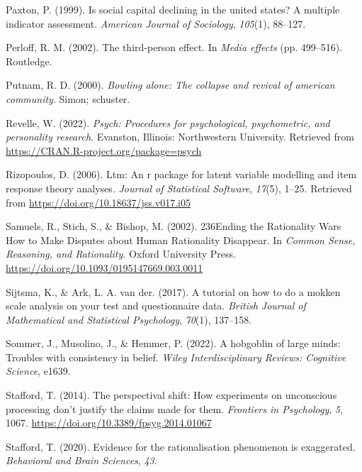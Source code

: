 \documentclass[
  ,jou,floatsintext]{apa6}
\newlength{\cslhangindent}
\newlength{\cslentryspacingunit} %
\newenvironment{CSLReferences}[2] %
 {%
  \setlength{\parindent}{0pt}
  \ifodd #1
  \let\oldpar\par
  \def\par{\hangindent=\cslhangindent\oldpar}
  \fi
  \setlength{\parskip}{#2\cslentryspacingunit}
 }%
 {}
\begin{document}
\begin{CSLReferences}{1}{0}
\leavevmode{}%
Paxton, P. (1999). Is social capital declining in the united states? A multiple indicator assessment. \emph{American Journal of Sociology}, \emph{105}(1), 88--127.

\leavevmode{}%
Perloff, R. M. (2002). The third-person effect. In \emph{Media effects} (pp. 499--516). Routledge.

\leavevmode{}%
Putnam, R. D. (2000). \emph{Bowling alone: The collapse and revival of american community}. Simon; schuster.

\leavevmode{}%
Revelle, W. (2022). \emph{Psych: Procedures for psychological, psychometric, and personality research}. Evanston, Illinois: Northwestern University. Retrieved from \url{https://CRAN.R-project.org/package=psych}

\leavevmode{}%
Rizopoulos, D. (2006). Ltm: An r package for latent variable modelling and item response theory analyses. \emph{Journal of Statistical Software}, \emph{17}(5), 1--25. Retrieved from \url{https://doi.org/10.18637/jss.v017.i05}

\leavevmode{}%
Samuels, R., Stich, S., \& Bishop, M. (2002). {236Ending the Rationality Wars How to Make Disputes about Human Rationality Disappear}. In \emph{{Common Sense, Reasoning, and Rationality}}. Oxford University Press. \url{https://doi.org/10.1093/0195147669.003.0011}

\leavevmode{}%
Sijtsma, K., \& Ark, L. A. van der. (2017). A tutorial on how to do a mokken scale analysis on your test and questionnaire data. \emph{British Journal of Mathematical and Statistical Psychology}, \emph{70}(1), 137--158.

\leavevmode{}%
Sommer, J., Musolino, J., \& Hemmer, P. (2022). A hobgoblin of large minds: Troubles with consistency in belief. \emph{Wiley Interdisciplinary Reviews: Cognitive Science}, e1639.

\leavevmode{}%
Stafford, T. (2014). The perspectival shift: How experiments on unconscious processing don't justify the claims made for them. \emph{Frontiers in Psychology}, \emph{5}, 1067. \url{https://doi.org/10.3389/fpsyg.2014.01067}

\leavevmode{}%
Stafford, T. (2020). Evidence for the rationalisation phenomenon is exaggerated. \emph{Behavioral and Brain Sciences}, \emph{43}.


\end{CSLReferences}
\end{document}
